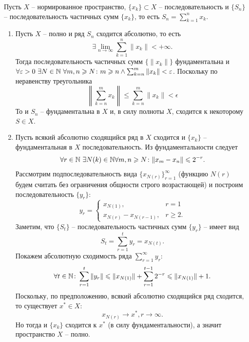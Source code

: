 \begin{solve}
    Пусть $X$ -- нормированное пространство, $\{x_k\} \subset X$ -- последовательность и $\{S_n\}$ -- последовательность частичных сумм $\{x_k\}$, то есть $S_n = \sum_{k = 1}^n x_k$.
    \begin{enumerate}
        \item Пусть $X$ -- полно и ряд $S_n$ сходится абсолютно, то есть
        \[
            \exists \lim\limits_{n \rightarrow \infty}\sum\limits_{k = 1}^n \|x_k\| < +\infty.
        \]
        Тогда последовательность частичных сумм $\{\|x_k\|\}$ фундаментальна и $\forall \epsilon > 0 \ \exists N \in \N \  \forall m, n \geq N\colon m \geq n \wedge  \sum_{k = n}^m \|x_k\| < \epsilon$. Поскольку по неравенству треугольника
        \[
            \left\|\sum\limits_{k = n}^m x_k\right\| \leq \sum\limits_{k = n}^m \|x_k\| < \epsilon
        \]
        То и $S_n$ -- фундаментальна в $X$ и, в силу полноты $X$, сходится к некоторому $S \in X$.
        \item Пусть всякий абсолютно сходящийся ряд в $X$ сходится и $\{x_k\}$ -- фундаментальная в $X$ последовательность. Из фундаментальности следует
        \[
            \forall r \in \mathbb{N} \ \exists N(k) \in \mathbb{N} \forall m, n \geqslant N\colon \|x_m - x_n\| \leqslant 2^{-r}.
        \]
        Рассмотрим подпоследовательность вида $\{x_{N(r)}\}_{r = 1}^{\infty}$ (функцию $N(r)$ будем считать без ограничения общности строго возрастающей) и построим последовательность $\{y_r\}\colon$
        \[
            y_r = \begin{cases}
                      x_{N(1)}, & r = 1 \\
                      x_{N(r)} - x_{N(r - 1)}, & r \geq 2.
            \end{cases}
        \]
        Заметим, что $\{S_t\}$ -- последовательность частичных сумм $\{y_r\}$ -- имеет вид
        \[
            S_t = \sum\limits_{r = 1}^t y_r = x_{N(t)}.
        \]
        Покажем абсолютную сходимость ряда $\sum\limits_{r = 1}^{\infty} y_r\colon$
        \[
            \forall t \in \mathbb{N} \colon \sum\limits_{r = 1}^t \|y_r\| \leqslant \|x_{N(1)}\| + \sum\limits_{r= 1}^{t - 1} 2^{-r} \leqslant \|x_{N(1)}\| + 1.
        \]
        Поскольку, по предположению, всякий абсолютно сходящийся ряд сходится, то существует $x^* \in X\colon$
        \[
            x_{N(r)} \rightarrow x^*, r \rightarrow \infty.
        \]
        Но тогда и $\{x_k\}$ сходится к $x^*$ (в силу фундаментальности), а значит пространство $X$ -- полно.
    \end{enumerate}
\end{solve}
